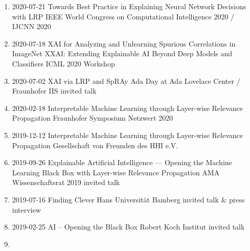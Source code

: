 {\begin{enumerate}
                    {2020-11-12}
                    {Efficient and Effective Neural Network Pruning with Layer-wise Relevance Propagation}
                    {Machine Learning Seminar at Fraunhofer HHI / Technische Universität Berlin}
    \item {}
                    {2020-07-21}
                    {Towards Best Practice in Explaining Neural Network Decisions with LRP}
                    {IEEE World Congress on Computational Intelligence 2020 / IJCNN 2020}
    \item {}
                    {2020-07-18}
                    {XAI for Analyzing and Unlearning Spurious Correlations in ImageNet}
                    {XXAI: Extending Explainable AI Beyond Deep Models and Classifiers}
                    {ICML 2020 Workshop}
    \item {}
                    {2020-07-02}
                    {XAI via LRP and SpRAy}
                    {Ada Day at Ada Lovelace Center / Fraunhofer IIS}
                    {invited talk}
    \item {}
                    {2020-02-18}
                    {Interpretable Machine Learning through Layer-wise Relevance Propagation}
                    {Fraunhofer Symposium Netzwert 2020}
    \item {}
                    {2019-12-12}
                    {Interpretable Machine Learning through Layer-wise Relevance Propagation}
                    {Gesellschaft von Freunden des HHI e.V.}
    \item {}
                    {2019-09-26}
                    {Explainable Artificial Intelligence --- Opening the Machine Learning Black Box with Layer-wise Relevance Propagation}
                    {AMA Wissenschaftsrat 2019}
                    {invited talk}
    \item {}
                    {2019-07-16}
                    {Finding Clever Hans}
                    {Universität Bamberg}
                    {invited talk \& press interview}
    \item {}
                    {2019-02-25}
                    {AI -- Opening the Black Box}
                    {Robert Koch Institut}
                    {invited talk}
    \item {}

\end{enumerate}}
